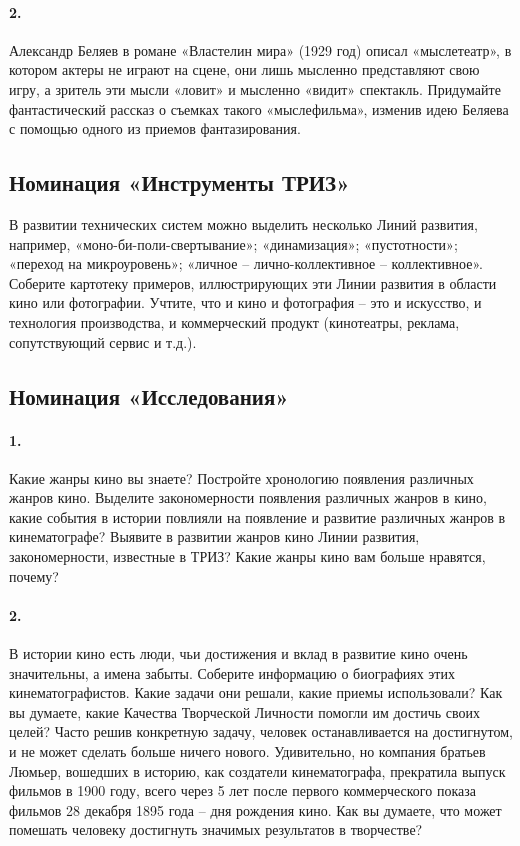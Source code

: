\documentclass[11pt,a4paper]{article}
\begin{document}
\paragraph{2.}
Александр Беляев в романе «Властелин мира» (1929 год) описал «мыслетеатр», в
котором актеры не играют на сцене, они лишь мысленно представляют свою игру, а
зритель эти мысли «ловит» и мысленно «видит» спектакль. Придумайте
фантастический рассказ о съемках такого «мыслефильма», изменив идею Беляева с
помощью одного из приемов фантазирования.

\subsection*{Номинация «Инструменты ТРИЗ»}

В развитии технических систем можно выделить несколько Линий развития,
например, «моно-би-поли-свертывание»; «динамизация»; «пустотности»; «переход
на микроуровень»; «личное – лично-коллективное – коллективное». Соберите
картотеку примеров, иллюстрирующих эти Линии развития в области кино или
фотографии. Учтите, что и кино и фотография – это и искусство, и технология
производства, и коммерческий продукт (кинотеатры, реклама, сопутствующий
сервис и т.д.).

\subsection*{Номинация «Исследования»}

\paragraph{1.}
Какие жанры кино вы знаете? Постройте хронологию появления различных жанров
кино. Выделите закономерности появления различных жанров в кино, какие события
в истории повлияли на появление и развитие различных жанров в кинематографе?
Выявите в развитии жанров кино Линии развития, закономерности, известные в
ТРИЗ? Какие жанры кино вам больше нравятся, почему?

\paragraph{2.}
В истории кино есть люди, чьи достижения и вклад в развитие кино очень
значительны, а имена забыты. Соберите информацию о биографиях этих
кинематографистов. Какие задачи они решали, какие приемы использовали? Как вы
думаете, какие Качества Творческой Личности помогли им достичь своих целей?
Часто решив конкретную задачу, человек останавливается на достигнутом, и не
может сделать больше ничего нового. Удивительно, но компания братьев Люмьер,
вошедших в историю, как создатели кинематографа, прекратила выпуск фильмов в
1900 году, всего через 5 лет после первого коммерческого показа фильмов 28
декабря 1895 года – дня рождения кино. Как вы думаете, что может помешать
человеку достигнуть значимых результатов в творчестве?
\end{document}
